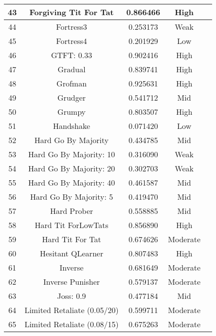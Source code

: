 \begin{longtable}{ccccc}
			43  & Forgiving Tit For Tat       & 0.866466          & High     \\ \hline
			44  & Fortress3                   & 0.253173          & Weak     \\ \hline
			45  & Fortress4                   & 0.201929          & Low      \\ \hline
			46  & GTFT: 0.33                  & 0.902416          & High     \\ \hline
			47  & Gradual                     & 0.839741          & High     \\ \hline
			48  & Grofman                     & 0.925631          & High     \\ \hline
			49  & Grudger                     & 0.541712          & Mid     \\ \hline
			50  & Grumpy                      & 0.803507          & High     \\ \hline
			51  & Handshake                   & 0.071420          & Low      \\ \hline
			52  & Hard Go By Majority         & 0.434785          & Mid     \\ \hline
			53  & Hard Go By Majority: 10     & 0.316090          & Weak     \\ \hline
			54  & Hard Go By Majority: 20     & 0.302703          & Weak     \\ \hline
			55  & Hard Go By Majority: 40     & 0.461587          & Mid     \\ \hline
			56  & Hard Go By Majority: 5      & 0.419470          & Mid     \\ \hline
			57  & Hard Prober                 & 0.558885          & Mid     \\ \hline
			58  & Hard Tit ForLowTats         & 0.856890          & High     \\ \hline
			59  & Hard Tit For Tat            & 0.674626          & Moderate \\ \hline
			60  & Hesitant QLearner           & 0.807483          & High     \\ \hline
			61  & Inverse                     & 0.681649          & Moderate \\ \hline
			62  & Inverse Punisher            & 0.579137          & Moderate \\ \hline
			63  & Joss: 0.9                   & 0.477184          & Mid     \\ \hline
			64  & Limited Retaliate (0.05/20) & 0.599711          & Moderate \\ \hline
			65  & Limited Retaliate (0.08/15) & 0.675263          & Moderate \\ \hline

\end{longtable}
